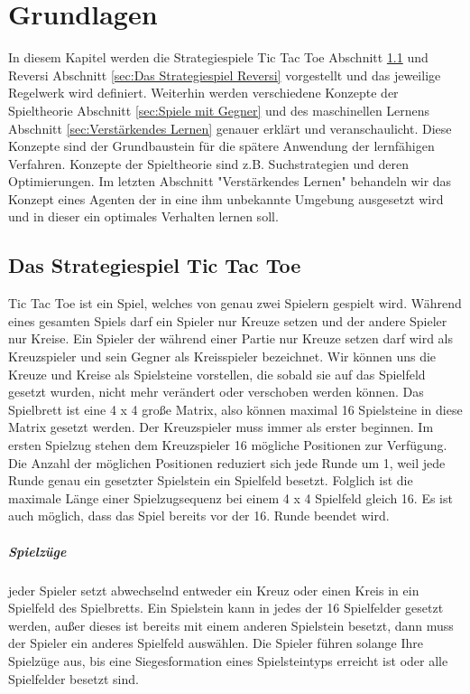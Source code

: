 \chapter{Grundlagen}
\label{cha:Grundlagen}

In diesem Kapitel werden die Strategiespiele Tic Tac Toe Abschnitt \ref{sec:Das Strategiespiel Tic Tac Toe} und Reversi Abschnitt \ref{sec:Das Strategiespiel Reversi} vorgestellt und das jeweilige Regelwerk wird definiert. Weiterhin werden verschiedene Konzepte der Spieltheorie Abschnitt \ref{sec:Spiele mit Gegner} und des maschinellen Lernens Abschnitt \ref{sec:Verstärkendes Lernen} genauer erklärt und veranschaulicht. Diese Konzepte sind der Grundbaustein für die spätere Anwendung der lernfähigen Verfahren. Konzepte der Spieltheorie sind z.B. Suchstrategien und deren Optimierungen. Im letzten Abschnitt "Verstärkendes Lernen" behandeln wir das Konzept eines Agenten der in eine ihm unbekannte Umgebung ausgesetzt wird und in dieser ein optimales Verhalten lernen soll.

\section{Das Strategiespiel Tic Tac Toe}
\label{sec:Das Strategiespiel Tic Tac Toe}

Tic Tac Toe ist ein Spiel, welches von genau zwei Spielern gespielt wird. Während eines gesamten Spiels darf ein Spieler nur Kreuze setzen und der andere Spieler nur Kreise. Ein Spieler der während einer Partie nur Kreuze setzen darf wird als Kreuzspieler und sein Gegner als Kreisspieler bezeichnet. Wir können uns die Kreuze und Kreise als Spielsteine vorstellen, die sobald sie auf das Spielfeld gesetzt wurden, nicht mehr verändert oder verschoben werden können. Das Spielbrett ist eine 4 x 4 große Matrix, also können maximal 16 Spielsteine in diese Matrix gesetzt werden. Der Kreuzspieler muss immer als erster beginnen. Im ersten Spielzug stehen dem Kreuzspieler 16 mögliche Positionen zur Verfügung. Die Anzahl der möglichen Positionen reduziert sich jede Runde um 1, weil jede Runde genau ein gesetzter Spielstein ein Spielfeld besetzt. Folglich ist die maximale Länge einer Spielzugsequenz bei einem 4 x 4 Spielfeld gleich 16. Es ist auch möglich, dass das Spiel bereits vor der 16. Runde beendet wird. \\

\paragraph{Spielzüge} jeder Spieler setzt abwechselnd entweder ein Kreuz oder einen Kreis in ein Spielfeld des Spielbretts. Ein Spielstein kann in jedes der 16 Spielfelder gesetzt werden, außer dieses ist bereits mit einem anderen Spielstein besetzt, dann muss der Spieler ein anderes Spielfeld auswählen. Die Spieler führen solange Ihre Spielzüge aus, bis eine Siegesformation eines Spielsteintyps erreicht ist oder alle Spielfelder besetzt sind. 

